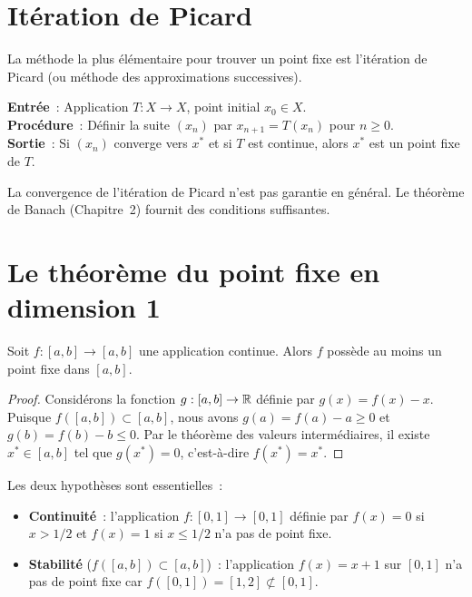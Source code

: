\section{It\'eration de Picard}

La m\'ethode la plus \'el\'ementaire pour trouver un point fixe est l'it\'eration
de Picard (ou m\'ethode des approximations successives).

\begin{algorithme}[title=\textbf{It\'eration de Picard}]
\textbf{Entr\'ee}~: Application $T : X \to X$, point initial $x_0 \in X$. \\
\textbf{Proc\'edure}~: D\'efinir la suite $(x_n)$ par $x_{n+1} = T(x_n)$ pour $n \geq 0$. \\
\textbf{Sortie}~: Si $(x_n)$ converge vers $x^*$ et si $T$ est continue, alors $x^*$ est un point fixe de $T$.
\end{algorithme}

\begin{remarque}
La convergence de l'it\'eration de Picard n'est pas garantie en g\'en\'eral.
Le th\'eor\`eme de Banach (Chapitre~2) fournit des conditions suffisantes.
\end{remarque}

\section{Le th\'eor\`eme du point fixe en dimension 1}

\begin{theoreme}
Soit $f : [a,b] \to [a,b]$ une application continue. Alors $f$ poss\`ede au
moins un point fixe dans $[a,b]$.
\end{theoreme}

\begin{proof}
Consid\'erons la fonction $g : [a,b] \to \mathbb{R}$ d\'efinie par $g(x) = f(x) - x$.
Puisque $f([a,b]) \subset [a,b]$, nous avons $g(a) = f(a) - a \geq 0$ et
$g(b) = f(b) - b \leq 0$. Par le th\'eor\`eme des valeurs interm\'ediaires,
il existe $x^* \in [a,b]$ tel que $g(x^*) = 0$, c'est-\`a-dire $f(x^*) = x^*$.
\end{proof}

\begin{attention}[title=\textbf{Hypoth\`eses n\'ecessaires}]
Les deux hypoth\`eses sont essentielles~:
\begin{itemize}
    \item \textbf{Continuit\'e}~: l'application $f : [0,1] \to [0,1]$ d\'efinie par
          $f(x) = 0$ si $x > 1/2$ et $f(x) = 1$ si $x \leq 1/2$ n'a pas de point fixe.
    \item \textbf{Stabilit\'e} ($f([a,b]) \subset [a,b]$)~: l'application
          $f(x) = x + 1$ sur $[0,1]$ n'a pas de point fixe car $f([0,1]) = [1,2] \not\subset [0,1]$.
\end{itemize}
\end{attention}

